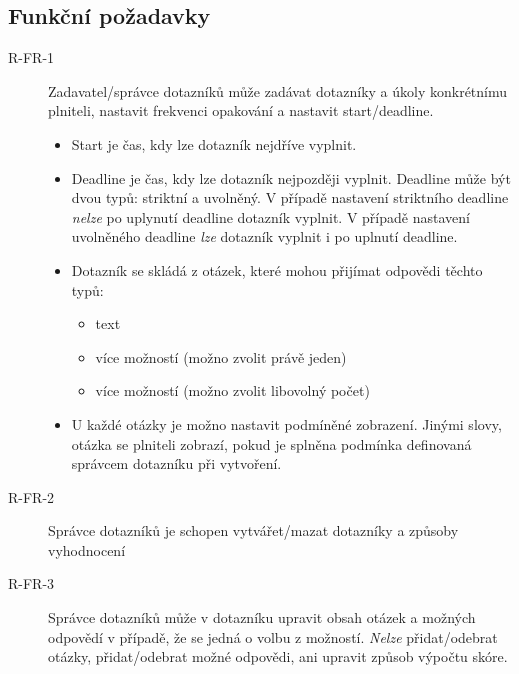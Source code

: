 \subsection{Funkční požadavky}\label{subsec:funkcni-pozadavky}
\begin{description}
    \item[R-FR-1]
    Zadavatel/správce dotazníků může zadávat dotazníky a úkoly konkrétnímu plniteli, nastavit frekvenci opakování a nastavit start/deadline.

    \begin{itemize}
        \item
        Start je čas, kdy lze dotazník nejdříve vyplnit.
        \item
        Deadline je čas, kdy lze dotazník nejpozději vyplnit.
        Deadline může být dvou typů: striktní a uvolněný.
        V případě nastavení striktního deadline \textit{nelze} po uplynutí deadline dotazník vyplnit.
        V případě nastavení uvolněného deadline \textit{lze} dotazník vyplnit i po uplnutí deadline.
        \item
        Dotazník se skládá z otázek, které mohou přijímat odpovědi těchto typů:

        \begin{itemize}
            \item
            text
            \item
            více možností (možno zvolit právě jeden)
            \item
            více možností (možno zvolit libovolný počet)
        \end{itemize}
        \item
        U každé otázky je možno nastavit podmíněné zobrazení.
        Jinými slovy, otázka se plniteli zobrazí, pokud je splněna podmínka definovaná správcem dotazníku při vytvoření.
    \end{itemize}
    \item[R-FR-2]
    Správce dotazníků je schopen vytvářet/mazat dotazníky a způsoby vyhodnocení
    \item[R-FR-3]
    Správce dotazníků může v dotazníku upravit obsah otázek a možných odpovědí v případě, že se jedná o volbu z možností.
    \textit{Nelze} přidat/odebrat otázky, přidat/odebrat možné odpovědi, ani upravit způsob výpočtu skóre.


\end{description}
